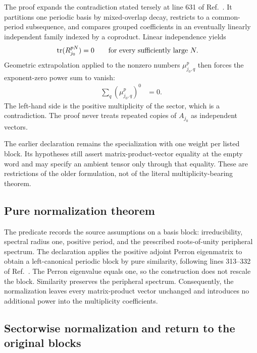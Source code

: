 \documentclass{article}
\begin{document}
The proof expands the contradiction stated tersely at line 631 of
Ref.~\cite{DeLasCuevas2017Irreducible}. It partitions one periodic basis by
mixed-overlap decay, restricts to a common-period subsequence, and compares
grouped coefficients in an eventually linearly independent family indexed by
a coproduct. Linear independence yields
\begin{align}
    \operatorname{tr}(R_{j_0}^{pN})
    &=0
    \qquad\text{for every sufficiently large }N.
    \label{eq:dccsp17_periodic_overlap_route_alignment_vanishing_power_sum}
\end{align}
Geometric extrapolation applied to the nonzero numbers $\mu_{j_0,q}^p$ then
forces the exponent-zero power sum to vanish:
\begin{align}
    \sum_q(\mu_{j_0,q}^p)^0
    &=0.
    \label{eq:dccsp17_periodic_overlap_route_alignment_zero_exponent_contradiction}
\end{align}
The left-hand side is the positive multiplicity of the sector, which is a
contradiction. The proof never treats repeated copies of $A_{j_0}$ as
independent vectors.

The earlier declaration
 remains the specialization
with one weight per listed block. Its hypotheses still assert
matrix-product-vector equality at the empty word and may specify an ambient
tensor only through that equality. These are restrictions of the older
formulation, not of the literal multiplicity-bearing theorem.

\subsection{Pure normalization theorem}

The predicate  records the source assumptions on a
basis block: irreducibility, spectral radius one, positive period, and the
prescribed roots-of-unity peripheral spectrum. The declaration
 applies the positive
adjoint Perron eigenmatrix to obtain a left-canonical periodic block by pure
similarity, following lines 313--332 of
Ref.~\cite{DeLasCuevas2017Irreducible}. The Perron eigenvalue equals one, so
the construction does not rescale the block. Similarity preserves the
peripheral spectrum. Consequently, the normalization leaves every
matrix-product vector unchanged and introduces no additional power into the
multiplicity coefficients.

\subsection{Sectorwise normalization and return to the original blocks}
\end{document}
